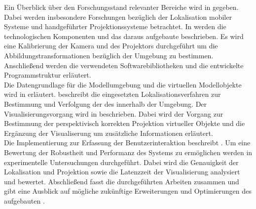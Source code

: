 Ein Überblick über den Forschungsstand relevanter Bereiche wird in  gegeben. Dabei werden insbesondere Forschungen bezüglich der Lokalisation mobiler Systeme und handgeführter Projektionssysteme betrachtet. In  werden die technologischen Komponenten und das daraus aufgebaute \kps{} beschrieben. Es wird eine Kalibrierung der Kamera und des Projektors durchgeführt um die Abbildungstransformationen bezüglich der Umgebung zu bestimmen. Anschließend werden die verwendeten Softwarebibliotheken und die entwickelte Programmstruktur erläutert.\\
Die Datengrundlage für die Modellumgebung und die virtuellen Modellobjekte wird in  erläutert.  beschreibt die eingesetzten Lokalisationsverfahren zur Bestimmung und Verfolgung der \red[Pose] des  innerhalb der Umgebung. Der Visualisierungsvorgang wird in  beschrieben. Dabei wird der Vorgang zur Bestimmung der perspektivisch korrekten Projektion virtueller Objekte und die Ergänzung der Visualiserung um zusätzliche Informationen erläutert.\\
Die Implementierung zur Erfassung der Benutzerinteraktion beschreibt . Um eine Bewertung der Robustheit und Performanz des Systems zu ermöglichen werden in  experimentelle Untersuchungen durchgeführt. Dabei wird die Genauigkeit der Lokalisation und Projektion sowie die Latenzzeit der Visualisierung analysiert und bewertet. Abschließend fasst  die durchgeführten Arbeiten zusammen und gibt eine Ausblick auf mögliche zukünftige Erweiterungen und Optimierungen des aufgebauten .

